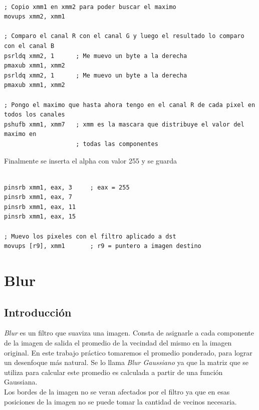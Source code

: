 \documentclass[10pt,a4paper,spanish]{article}
\begin{document}
\begin{codesnippet}
\begin{verbatim}

; Copio xmm1 en xmm2 para poder buscar el maximo
movups xmm2, xmm1

; Comparo el canal R con el canal G y luego el resultado lo comparo con el canal B
psrldq xmm2, 1		; Me muevo un byte a la derecha
pmaxub xmm1, xmm2
psrldq xmm2, 1		; Me muevo un byte a la derecha
pmaxub xmm1, xmm2

; Pongo el maximo que hasta ahora tengo en el canal R de cada pixel en todos los canales
pshufb xmm1, xmm7   ; xmm es la mascara que distribuye el valor del maximo en 
                    ; todas las componentes

\end{verbatim}
\end{codesnippet}

Finalmente se inserta el alpha con valor 255 y se guarda

\begin{codesnippet}
\begin{verbatim}

pinsrb xmm1, eax, 3     ; eax = 255
pinsrb xmm1, eax, 7
pinsrb xmm1, eax, 11
pinsrb xmm1, eax, 15

; Muevo los pixeles con el filtro aplicado a dst
movups [r9], xmm1       ; r9 = puntero a imagen destino

\end{verbatim}
\end{codesnippet}

\section{Blur}

\subsection{Introducción}

\textit{Blur} es un filtro que suaviza una imagen. Consta de asignarle a cada componente de la imagen de salida el promedio de la vecindad del mismo en la imagen original. En este trabajo práctico tomaremos el promedio ponderado, para lograr un desenfoque más natural. Se lo llama \textit{Blur Gaussiano} ya que la matriz que se utiliza para calcular este promedio es calculada a partir de una función Gaussiana. \\

Los bordes de la imagen no se veran afectados por el filtro ya que en esas posiciones de la imagen no se puede tomar la cantidad de vecinos necesaria. \\
\end{document}
